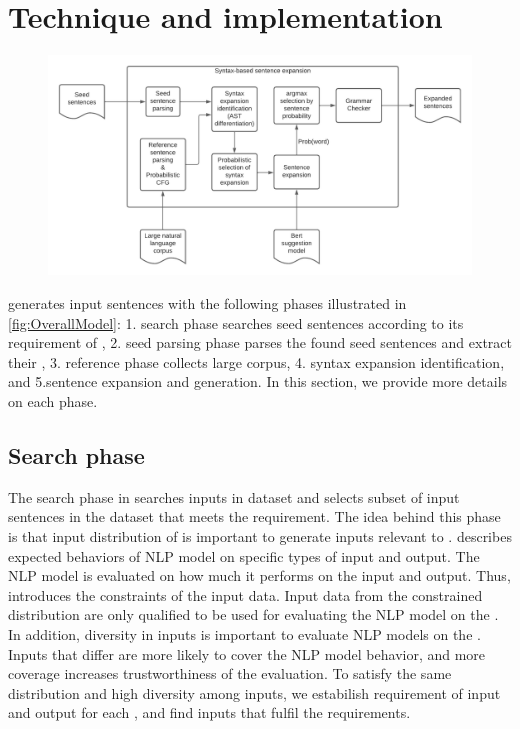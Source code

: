 \section{Technique and implementation}

\begin{figure}
  \centering
  \includegraphics[scale=0.5]{figs/overall.pdf}
  \vspace{-5pt}
  \caption{\OverallModelFigCaption}
  \vspace{-10pt}
\end{figure}

\Model generates input sentences with the following phases illustrated
in \ref{fig:OverallModel}: 1. search phase searches seed sentences according to
its requirement of \lc, 2. seed parsing phase parses the found seed
sentences and extract their \cfg, 3. reference phase collects large
corpus, 4. syntax expansion identification, and 5.sentence expansion
and generation. In this section, we provide more details on each phase.

\subsection{Search phase}
The search phase in \Model searches inputs in dataset and selects
subset of input sentences in the dataset that meets the \lc
requirement. The idea behind this phase is that input distribution of
\lc is important to generate inputs relevant to \lc. \Lc describes
expected behaviors of NLP model on specific types of input and
output. The NLP model is evaluated on how much it performs on the
input and output. Thus, \lc introduces the constraints of the input
data. Input data from the constrained distribution are only qualified
to be used for evaluating the NLP model on the \lc.  In addition,
diversity in inputs is important to evaluate NLP models on the
\lc. Inputs that differ are more likely to cover the NLP model
behavior, and more coverage increases trustworthiness of the
evaluation. To satisfy the same distribution and high
diversity among inputs, we estabilish requirement of input and output
for each \lc, and find inputs that fulfil the requirements.

